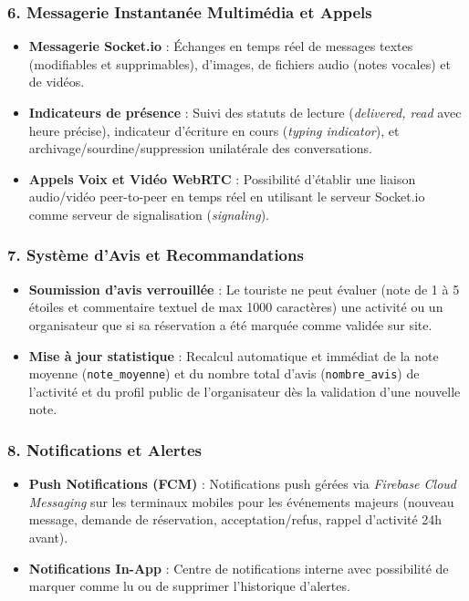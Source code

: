 \documentclass[12pt,a4paper]{report}
\begin{document}
\subsubsection{6. Messagerie Instantanée Multimédia et Appels}
\begin{itemize}[label=\textbullet]
    \item \textbf{Messagerie Socket.io} : Échanges en temps réel de messages textes (modifiables et supprimables), d'images, de fichiers audio (notes vocales) et de vidéos.
    \item \textbf{Indicateurs de présence} : Suivi des statuts de lecture (\textit{delivered, read} avec heure précise), indicateur d'écriture en cours (\textit{typing indicator}), et archivage/sourdine/suppression unilatérale des conversations.
    \item \textbf{Appels Voix et Vidéo WebRTC} : Possibilité d'établir une liaison audio/vidéo peer-to-peer en temps réel en utilisant le serveur Socket.io comme serveur de signalisation (\textit{signaling}).
\end{itemize}

\subsubsection{7. Système d'Avis et Recommandations}
\begin{itemize}[label=\textbullet]
    \item \textbf{Soumission d'avis verrouillée} : Le touriste ne peut évaluer (note de 1 à 5 étoiles et commentaire textuel de max 1000 caractères) une activité ou un organisateur que si sa réservation a été marquée comme validée sur site.
    \item \textbf{Mise à jour statistique} : Recalcul automatique et immédiat de la note moyenne (\texttt{note\_moyenne}) et du nombre total d'avis (\texttt{nombre\_avis}) de l'activité et du profil public de l'organisateur dès la validation d'une nouvelle note.
\end{itemize}

\subsubsection{8. Notifications et Alertes}
\begin{itemize}[label=\textbullet]
    \item \textbf{Push Notifications (FCM)} : Notifications push gérées via \textit{Firebase Cloud Messaging} sur les terminaux mobiles pour les événements majeurs (nouveau message, demande de réservation, acceptation/refus, rappel d'activité 24h avant).
    \item \textbf{Notifications In-App} : Centre de notifications interne avec possibilité de marquer comme lu ou de supprimer l'historique d'alertes.
\end{itemize}
\end{document}
